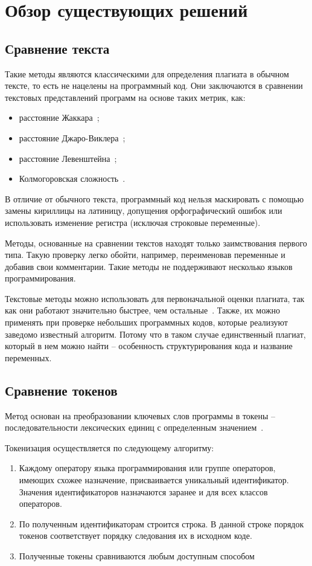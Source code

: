 \section{Обзор существующих решений}

\subsection{Сравнение текста}
Такие методы являются классическими для определения плагиата в обычном тексте, то есть не нацелены на программный код. Они заключаются в сравнении текстовых представлений программ на основе таких метрик, как:
\begin{itemize}[label*=---]
	\item расстояние Жаккара~\cite{Jaccard};
	\item расстояние Джаро-Виклера~\cite{Jaro};
	\item расстояние Левенштейна~\cite{Lev};
	\item Колмогоровская сложность~\cite{Kolm}.
\end{itemize}

В отличие от обычного текста, программный код нельзя маскировать с помощью замены кириллицы на латиницу, допущения орфографический ошибок или использовать изменение регистра (исключая строковые переменные).

Методы, основанные на сравнении текстов находят только заимствования первого типа. Такую проверку легко обойти, например, переименовав переменные и добавив свои комментарии. Такие методы не поддерживают несколько языков программирования. 

Текстовые методы можно использовать для первоначальной оценки плагиата, так как они работают значительно быстрее, чем остальные~\cite{text}. Также, их можно применять при проверке небольших программных кодов, которые реализуют заведомо известный алгоритм. Потому что в таком случае единственный плагиат, который в нем можно найти -- особенность структурирования кода и название переменных. 

\subsection{Сравнение токенов}
Метод основан на преобразовании ключевых слов программы в токены -- последовательности лексических единиц с определенным значением~\cite{token}. 

Токенизация осуществляется по следующему алгоритму:
\begin{enumerate}
	\item Каждому оператору языка программирования или группе операторов, имеющих схожее назначение, присваивается уникальный идентификатор. Значения идентификаторов назначаются заранее и для
	всех классов операторов.
	\item По полученным идентификаторам строится строка. В данной строке порядок токенов соответствует порядку следования их в исходном коде.
	\item Полученные токены сравниваются любым доступным способом
\end{enumerate}

